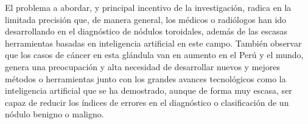 El problema a abordar, y principal incentivo de la investigación, radica en la limitada precisión que, de manera general, los médicos o radiólogos han ido desarrollando en el diagnóstico de nódulos toroidales, además de las escasas herramientas basadas en inteligencia artificial en este campo. También observar que los casos de cáncer en esta glándula van en aumento en el Perú y el mundo, genera una preocupación y alta necesidad de desarrollar nuevos y mejores métodos o herramientas junto con los grandes avances tecnológicos como la inteligencia artificial que se ha demostrado, aunque de forma muy escasa, ser capaz de reducir los índices de errores en el diagnóstico o clasificación de un nódulo benigno o maligno.
